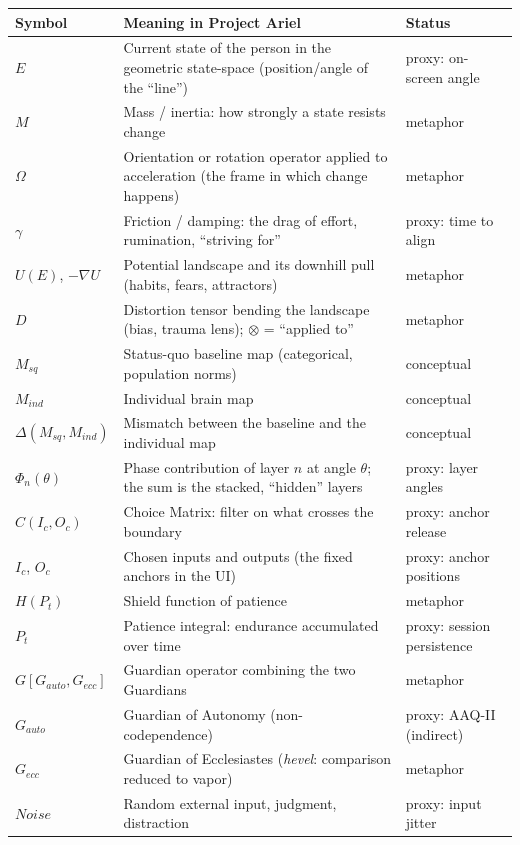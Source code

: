 \documentclass[11pt]{article}
\begin{document}
{\small
\begin{tabularx}{\textwidth}{@{}l X l@{}}
\toprule
\textbf{Symbol} & \textbf{Meaning in Project Ariel} & \textbf{Status}\\\midrule
$E$ & Current state of the person in the geometric state-space (position/angle of the ``line'') & proxy: on-screen angle\\
$M$ & Mass / inertia: how strongly a state resists change & metaphor\\
$\Omega$ & Orientation or rotation operator applied to acceleration (the frame in which change happens) & metaphor\\
$\gamma$ & Friction / damping: the drag of effort, rumination, ``striving for'' & proxy: time to align\\
$U(E)$, $-\nabla U$ & Potential landscape and its downhill pull (habits, fears, attractors) & metaphor\\
$D$ & Distortion tensor bending the landscape (bias, trauma lens); $\otimes$ = ``applied to'' & metaphor\\
$M_{sq}$ & Status-quo baseline map (categorical, population norms) & conceptual\\
$M_{ind}$ & Individual brain map & conceptual\\
$\Delta(M_{sq},M_{ind})$ & Mismatch between the baseline and the individual map & conceptual\\
$\Phi_n(\theta)$ & Phase contribution of layer $n$ at angle $\theta$; the sum is the stacked, ``hidden'' layers & proxy: layer angles\\
$C(I_c,O_c)$ & Choice Matrix: filter on what crosses the boundary & proxy: anchor release\\
$I_c$, $O_c$ & Chosen inputs and outputs (the fixed anchors in the UI) & proxy: anchor positions\\
$H(P_t)$ & Shield function of patience & metaphor\\
$P_t$ & Patience integral: endurance accumulated over time & proxy: session persistence\\
$G[G_{auto},G_{ecc}]$ & Guardian operator combining the two Guardians & metaphor\\
$G_{auto}$ & Guardian of Autonomy (non-codependence) & proxy: AAQ-II (indirect)\\
$G_{ecc}$ & Guardian of Ecclesiastes (\emph{hevel}: comparison reduced to vapor) & metaphor\\
$\mathit{Noise}$ & Random external input, judgment, distraction & proxy: input jitter\\

\end{tabularx}}
\end{document}
